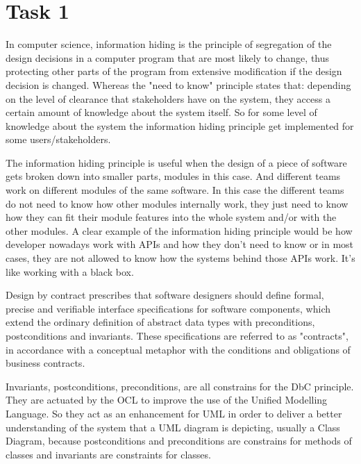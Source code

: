 \chapter{Task 1}
\begin{parlist}
	\item In computer science, information hiding is the principle of segregation of the design decisions in a computer program that are most likely to change, thus protecting other parts of the program from extensive modification if the design decision is changed. Whereas the "need to know" principle states that: depending on the level of clearance that stakeholders have on the system, they access a certain amount of knowledge about the system itself. So for some level of knowledge about the system the information hiding principle get implemented for some users/stakeholders. \cite{wikipediaInformationHiding}
	\item The information hiding principle is useful when the design of a piece of software gets broken down into smaller parts, modules in this case. And different teams work on different modules of the same software. In this case the different teams do not need to know how other modules internally work, they just need to know how they can fit their module features into the whole system and/or with the other modules. A clear example of the information hiding principle would be how developer nowadays work with APIs and how they don't need to know or in most cases, they are not allowed to know how the systems behind those APIs work. It's like working with a black box. \cite{wikipediaInformationHiding}
	\item Design by contract prescribes that software designers should define formal, precise and verifiable interface specifications for software components, which extend the ordinary definition of abstract data types with preconditions, postconditions and invariants. These specifications are referred to as "contracts", in accordance with a conceptual metaphor with the conditions and obligations of business contracts.
	\item Invariants, postconditions, preconditions, are all constrains for the DbC principle. They are actuated by the OCL to improve the use of the Unified Modelling Language. So they act as an enhancement for UML in order to deliver a better understanding of the system that a UML diagram is depicting, usually a Class Diagram, because postconditions and preconditions are constrains for methods of classes and invariants are constraints for classes. \cite{wikipediaDesignContract}\cite{10.1007/978-3-642-30982-3_3}
\end{parlist}